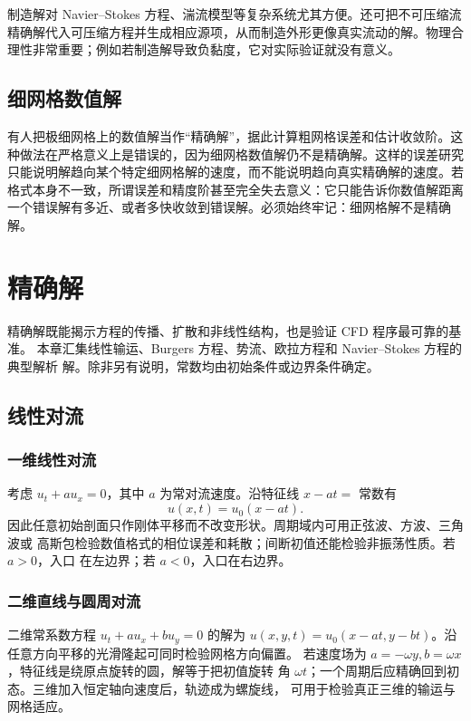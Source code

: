\documentclass[11pt,a4paper,openany,fontset=none]{ctexbook}
\begin{document}
制造解对 Navier--Stokes 方程、湍流模型等复杂系统尤其方便。还可把不可压缩流精确解代入可压缩方程并生成相应源项，从而制造外形更像真实流动的解。物理合理性非常重要；例如若制造解导致负黏度，它对实际验证就没有意义。

\section{细网格数值解}

有人把极细网格上的数值解当作“精确解”，据此计算粗网格误差和估计收敛阶。这种做法在严格意义上是错误的，因为细网格数值解仍不是精确解。这样的误差研究只能说明解趋向某个特定细网格解的速度，而不能说明趋向真实精确解的速度。若格式本身不一致，所谓误差和精度阶甚至完全失去意义：它只能告诉你数值解距离一个错误解有多近、或者多快收敛到错误解。必须始终牢记：细网格解不是精确解。


\chapter{精确解}

精确解既能揭示方程的传播、扩散和非线性结构，也是验证 CFD 程序最可靠的基准。
本章汇集线性输运、Burgers 方程、势流、欧拉方程和 Navier--Stokes 方程的典型解析
解。除非另有说明，常数均由初始条件或边界条件确定。

\section{线性对流}
\subsection{一维线性对流}
考虑 $u_t+a u_x=0$，其中 $a$ 为常对流速度。沿特征线 $x-at=$ 常数有
\begin{equation}u(x,t)=u_0(x-at).
\end{equation}
因此任意初始剖面只作刚体平移而不改变形状。周期域内可用正弦波、方波、三角波或
高斯包检验数值格式的相位误差和耗散；间断初值还能检验非振荡性质。若 $a>0$，入口
在左边界；若 $a<0$，入口在右边界。

\subsection{二维直线与圆周对流}
二维常系数方程 $u_t+a u_x+b u_y=0$ 的解为
$u(x,y,t)=u_0(x-at,y-bt)$。沿任意方向平移的光滑隆起可同时检验网格方向偏置。
若速度场为 $a=-\omega y,b=\omega x$，特征线是绕原点旋转的圆，解等于把初值旋转
角 $\omega t$；一个周期后应精确回到初态。三维加入恒定轴向速度后，轨迹成为螺旋线，
可用于检验真正三维的输运与网格适应。
\end{document}
